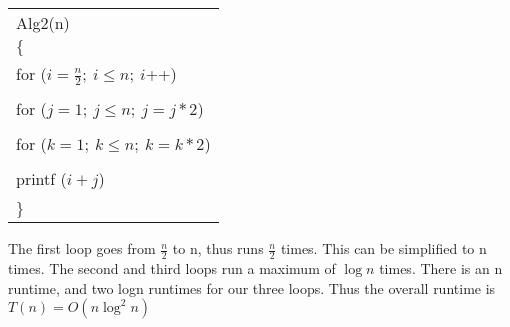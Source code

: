 \documentclass[10pt]{article}
\begin{document}
\begin{enumerate}
{\tt
\begin{tabular} {l}
Alg2(n) \\
  $\{$  \\
     \hspace{5mm}for ($i = \frac{n}{2};\ i \leq n;\ i$++)  \\ \\
     \hspace{10mm}for ($j=1;\ j \leq n;\ j = j * 2$)\\ \\
      \hspace{15mm}for ($k=1;\ k \leq n;\ k = k * 2$)\\ \\
       \hspace{20mm}printf ($i + j$)\\ \\
  $\}$  \\
\end{tabular}
}

The first loop goes from $\frac{n}{2}$ to n, thus runs $\frac{n}{2}$ times. This can be simplified to n times. The second and third loops run a maximum of $\log n$ times. There is an n runtime, and two logn runtimes for our three loops. Thus the overall runtime is $T(n) = O(n \log^{2} n)$





\end{enumerate}
\end{document}
